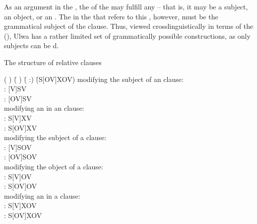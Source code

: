  As an argument in the , the  of the  may fulfill any  -- that is, it may be a subject, an object, or an . The  in the  that refers to this , however, must be the grammatical subject of the clause. Thus, viewed crosslinguistically in terms of the   (\citealt{KeenanComrie1977}), Ulwa has a rather limited set of grammatically possible  constructions, as only subjects can be d.

\newpage

\ea%
    \label{ex:complex:80a}
The structure of relative clauses\\
\begin{tabbing}
{( )} \= {( )} \= {( :)} \= {(S[OV]XOV)}\kill
{ modifying the subject of an  clause:}\\
{ } \> { } \> { :} \> {[V]SV}\\
{ } \> { } \> { :} \> [{OV]SV}\\
{ modifying an  in an  clause:}\\
{ } \> { } \> { :} \> {S[V]XV}\\
{ } \> { } \> { :} \> {S[OV]XV}\\
{ modifying the subject of a  clause:}\\
{ } \> { } \> { :} \> {[V]SOV}\\
{ } \> { } \> { :} \> {[OV]SOV}\\
{ modifying the object of a  clause:}\\
{ } \> { } \> { :} \> {S[V]OV}\\
{ } \> { } \> { :} \> {S[OV]OV}\\
{ modifying an  in a  clause:}\\
{ } \> { } \> { :} \> {S[V]XOV}\\
{ } \> { } \> { :} \> {S[OV]XOV}
\end{tabbing}
\z

